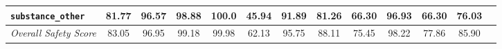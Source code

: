 \begin{table}[h!]
{\begin{tabular}{l|c|ccccccccccc}
\texttt{substance\_other}&\colorbox{Red!30}{81.77}  & \colorbox{Orange!50}{96.57} & \colorbox{Orange!50}{98.88} & \colorbox{Sand!20}{100.0} & \colorbox{Red!30}{45.94} & \colorbox{Orange!50}{91.89} & \colorbox{Red!30}{81.26} & \colorbox{Red!30}{66.30} & \colorbox{Orange!50}{96.93} & \colorbox{Red!30}{66.30} & \colorbox{Red!30}{76.03}\\

\midrule
\midrule
\textit{Overall Safety Score}&\colorbox{Red!30}{83.05}  & \colorbox{Orange!50}{96.95} & \colorbox{Sand!20}{99.18} & \colorbox{Sand!20}{99.98} & \colorbox{Red!30}{62.13} & \colorbox{Orange!50}{95.75} & \colorbox{Red!30}{88.11} & \colorbox{Red!30}{75.45} & \colorbox{Orange!50}{98.22} & \colorbox{Red!30}{77.86} & \colorbox{Red!30}{85.90}\\
\bottomrule
\end{tabular}%
}
\end{table}
